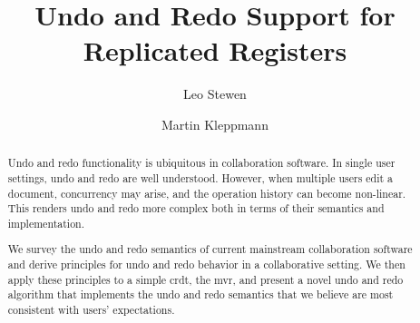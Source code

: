\documentclass[sigplan,natbib=false,review]{acmart}
\begin{document}
\title{Undo and Redo Support for Replicated Registers}

\author{Leo Stewen}

\author{Martin Kleppmann}


\begin{abstract}
Undo and redo functionality is ubiquitous in collaboration software.
In single user settings, undo and redo are well understood.
However, when multiple users edit a document,
concurrency may arise, and the operation history can become non-linear.
This renders undo and redo more complex
both in terms of their semantics and implementation.

We survey the undo and redo semantics of current mainstream collaboration software
and derive principles for undo and redo behavior in a collaborative setting.
We then apply these principles to a simple \acrshort{crdt}, the \acrlong{mvr},
and present a novel undo and redo algorithm that implements the undo and redo
semantics that we believe are most consistent with users' expectations.
\end{abstract}
\end{document}

